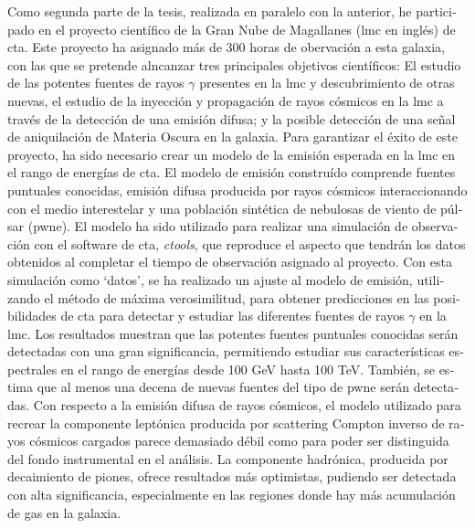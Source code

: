 \documentclass[main.tex]{subfiles}
\begin{document}
\begin{otherlanguage}{spanish}
Como segunda parte de la tesis, realizada en paralelo con la anterior, he participado en el proyecto científico de la Gran Nube de Magallanes (\gls{lmc} en inglés) de \gls{cta}. Este proyecto ha asignado más de 300 horas de obervación a esta galaxia, con las que se pretende alncanzar tres principales objetivos científicos: El estudio de las potentes fuentes de rayos $\gamma$ presentes en la \gls{lmc} y descubrimiento de otras nuevas, el estudio de la inyección y propagación de rayos cósmicos en la \gls{lmc} a través de la detección de una emisión difusa; y la posible detección de una señal de aniquilación de Materia Oscura en la galaxia. Para garantizar el éxito de este proyecto, ha sido necesario crear un modelo de la emisión esperada en la \gls{lmc} en el rango de energías de \gls{cta}. El modelo de emisión construído comprende fuentes puntuales conocidas, emisión difusa producida por rayos cósmicos interaccionando con el medio interestelar y una población sintética de nebulosas de viento de púlsar (\gls{pwne}). El modelo ha sido utilizado para realizar una simulación de observación con el software de \gls{cta}, \textit{ctools}, que reproduce el aspecto que tendrán los datos obtenidos al completar el tiempo de observación asignado al proyecto. Con esta simulación como `datos', se ha realizado un ajuste al modelo de emisión, utilizando el método de máxima verosimilitud, para obtener predicciones en las posibilidades de \gls{cta} para detectar y estudiar las diferentes fuentes de rayos $\gamma$ en la \gls{lmc}. Los resultados muestran que las potentes fuentes puntuales conocidas serán detectadas con una gran significancia, permitiendo estudiar sus características espectrales en el rango de energías desde 100 GeV hasta 100 TeV. También, se estima que al menos una decena de nuevas fuentes del tipo de \gls{pwne} serán detectadas. Con respecto a la emisión difusa de rayos cósmicos, el modelo utilizado para recrear la componente leptónica producida por scattering Compton inverso de rayos cósmicos cargados parece demasiado débil como para poder ser distinguida del fondo instrumental en el análisis. La componente hadrónica, producida por decaimiento de piones, ofrece resultados más optimistas, pudiendo ser detectada con alta significancia, especialmente en las regiones donde hay más acumulación de gas en la galaxia.\\

\end{otherlanguage}
\end{document}
